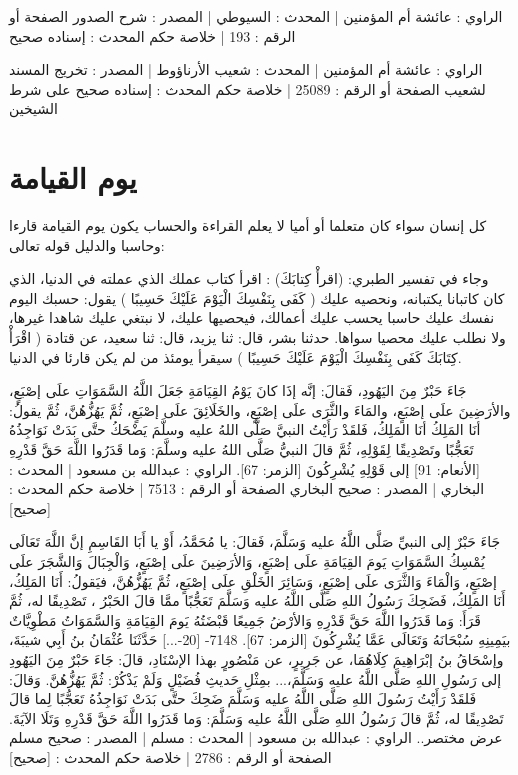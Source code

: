 الراوي : عائشة أم المؤمنين | المحدث : السيوطي | المصدر : شرح الصدور
الصفحة أو الرقم : 193 | خلاصة حكم المحدث : إسناده صحيح 

الراوي : عائشة أم المؤمنين | المحدث : شعيب الأرناؤوط | المصدر : تخريج المسند لشعيب
الصفحة أو الرقم : 25089 | خلاصة حكم المحدث : إسناده صحيح على شرط الشيخين 

\section{يوم القيامة}

كل إنسان سواء كان متعلما أو أميا لا يعلم القراءة والحساب يكون يوم القيامة قارءا وحاسبا والدليل قوله تعالى: 

\quranayah*[17][13-14]{\footnotesize \surahname*[17]}

وجاء في تفسير الطبري: 
(اقرأْ كِتابَكَ) : اقرأ كتاب عملك الذي عملته في الدنيا، الذي كان كاتبانا يكتبانه، ونحصيه عليك ( كَفَى بِنَفْسِكَ الْيَوْمَ عَلَيْكَ حَسِيبًا ) يقول: حسبك اليوم نفسك عليك حاسبا يحسب عليك أعمالك، فيحصيها عليك، لا نبتغي عليك شاهدا غيرها، ولا نطلب عليك محصيا سواها. حدثنا بشر، قال: ثنا يزيد، قال: ثنا سعيد، عن قتادة ( اقْرَأْ كِتَابَكَ كَفَى بِنَفْسِكَ الْيَوْمَ عَلَيْكَ حَسِيبًا ) سيقرأ يومئذ من لم يكن قارئا في الدنيا.

جَاءَ حَبْرٌ مِنَ اليَهُودِ، فَقالَ: إنَّه إذَا كانَ يَوْمُ القِيَامَةِ جَعَلَ اللَّهُ السَّمَوَاتِ علَى إصْبَعٍ، والأرَضِينَ علَى إصْبَعٍ، والمَاءَ والثَّرَى علَى إصْبَعٍ، والخَلَائِقَ علَى إصْبَعٍ، ثُمَّ يَهُزُّهُنَّ، ثُمَّ يقولُ: أنَا المَلِكُ أنَا المَلِكُ، فَلقَدْ رَأَيْتُ النبيَّ صَلَّى اللهُ عليه وسلَّمَ يَضْحَكُ حتَّى بَدَتْ نَوَاجِذُهُ تَعَجُّبًا وتَصْدِيقًا لِقَوْلِهِ، ثُمَّ قالَ النبيُّ صَلَّى اللهُ عليه وسلَّمَ: {وَما قَدَرُوا اللَّهَ حَقَّ قَدْرِهِ} [الأنعام: 91] إلى قَوْلِهِ {يُشْرِكُونَ} [الزمر: 67].
الراوي : عبدالله بن مسعود | المحدث : البخاري | المصدر : صحيح البخاري
الصفحة أو الرقم : 7513 | خلاصة حكم المحدث : [صحيح]

جَاءَ حَبْرٌ إلى النبيِّ صَلَّى اللَّهُ عليه وَسَلَّمَ، فَقالَ: يا مُحَمَّدُ، أَوْ يا أَبَا القَاسِمِ إنَّ اللَّهَ تَعَالَى يُمْسِكُ السَّمَوَاتِ يَومَ القِيَامَةِ علَى إصْبَعٍ، وَالأرَضِينَ علَى إصْبَعٍ، وَالْجِبَالَ وَالشَّجَرَ علَى إصْبَعٍ، وَالْمَاءَ وَالثَّرَى علَى إصْبَعٍ، وَسَائِرَ الخَلْقِ علَى إصْبَعٍ، ثُمَّ يَهُزُّهُنَّ، فيَقولُ: أَنَا المَلِكُ، أَنَا المَلِكُ، فَضَحِكَ رَسُولُ اللهِ صَلَّى اللَّهُ عليه وَسَلَّمَ تَعَجُّبًا ممَّا قالَ الحَبْرُ ، تَصْدِيقًا له، ثُمَّ قَرَأَ: {وَما قَدَرُوا اللَّهَ حَقَّ قَدْرِهِ وَالأرْضُ جَمِيعًا قَبْضَتُهُ يَومَ القِيَامَةِ وَالسَّمَوَاتُ مَطْوِيَّاتٌ بيَمِينِهِ سُبْحَانَهُ وَتَعَالَى عَمَّا يُشْرِكُونَ} [الزمر: 67]. 7148- [20-...] حَدَّثَنَا عُثْمَانُ بنُ أَبِي شيبَةَ، وإسْحَاقُ بنُ إبْرَاهِيمَ كِلَاهُمَا، عن جَرِيرٍ، عن مَنْصُورٍ بهذا الإسْنَادِ، قالَ: جَاءَ حَبْرٌ مِنَ اليَهُودِ إلى رَسُولِ اللهِ صَلَّى اللَّهُ عليه وَسَلَّمَ،... بمِثْلِ حَديثِ فُضَيْلٍ وَلَمْ يَذْكُرْ: ثُمَّ يَهُزُّهُنَّ. وَقالَ: فَلقَدْ رَأَيْتُ رَسُولَ اللهِ صَلَّى اللَّهُ عليه وَسَلَّمَ ضَحِكَ حتَّى بَدَتْ نَوَاجِذُهُ تَعَجُّبًا لِما قالَ تَصْدِيقًا له، ثُمَّ قالَ رَسُولُ اللهِ صَلَّى اللَّهُ عليه وَسَلَّمَ: {وَما قَدَرُوا اللَّهَ حَقَّ قَدْرِهِ} وَتَلَا الآيَةَ.
عرض مختصر..
الراوي : عبدالله بن مسعود | المحدث : مسلم | المصدر : صحيح مسلم
الصفحة أو الرقم : 2786 | خلاصة حكم المحدث : [صحيح]

